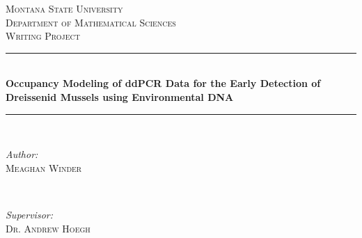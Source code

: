 \documentclass[12pt]{article}\usepackage[]{graphicx}\usepackage[]{color}
\begin{document}
\begin{titlepage}

\newcommand{\HRule}{\rule{\linewidth}{0.5mm}} %

\center %
 

\textsc{\LARGE Montana State University}\\[0.5cm] %
\textsc{\Large Department of Mathematical Sciences}\\[0.5cm] %
\textsc{\large Writing Project}\\[.75cm] %


\HRule \\[0.4cm]
{ \LARGE \bfseries Occupancy Modeling of ddPCR Data for the Early Detection of Dreissenid Mussels using Environmental DNA}\\[0.4cm] %
\HRule \\[1.5cm]
 

\begin{minipage}{0.4\textwidth}
\begin{flushleft} 
\large
\emph{Author:} \\
\textsc{Meaghan Winder} \\
\end{flushleft}
\end{minipage}
~
\begin{minipage}{0.4\textwidth}
\begin{flushright} 
\large
\emph{Supervisor:} \\
\textsc{Dr. Andrew Hoegh} 
\end{flushright}
\end{minipage}\\[1.5cm]


\end{titlepage}
\end{document}
